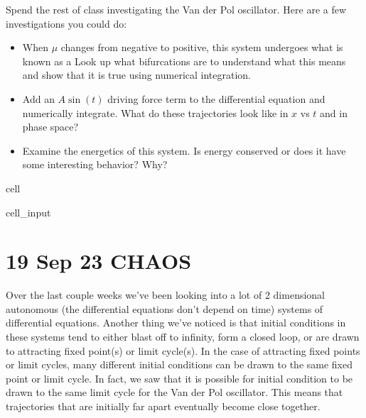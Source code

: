 \documentclass[letterpaper,10pt,english]{jupyterBook}
\begin{document}
\sphinxAtStartPar
Spend the rest of class investigating the Van der Pol oscillator. Here are a few investigations you could do:
\begin{itemize}
\item {} 
\sphinxAtStartPar
When \(\mu\) changes from negative to positive, this system undergoes what is known as a  Look up what bifurcations are to understand what this means and show that it is true using numerical integration.

\item {} 
\sphinxAtStartPar
Add an \(A\sin(t)\) driving force term to the differential equation and numerically integrate. What do these trajectories look like in \(x\) vs \(t\) and in phase space?

\item {} 
\sphinxAtStartPar
Examine the energetics of this system. Is energy conserved or does it have some interesting behavior? Why?

\end{itemize}

\begin{sphinxuseclass}{cell}\begin{sphinxVerbatimInput}

\begin{sphinxuseclass}{cell_input}
\begin{sphinxVerbatim}[commandchars=\\\{\}]
\end{sphinxVerbatim}

\end{sphinxuseclass}\end{sphinxVerbatimInput}

\end{sphinxuseclass}
\sphinxstepscope


\chapter{19 Sep 23 \sphinxhyphen{} CHAOS}
\label{\detokenize{content/1_mechanics/CHAOS:sep-23-chaos}}\label{\detokenize{content/1_mechanics/CHAOS::doc}}
\sphinxAtStartPar
Over the last couple weeks we’ve been looking into a lot of 2 dimensional autonomous (the differential equations don’t depend on time) systems of differential equations.
Another thing we’ve noticed is that initial conditions in these systems tend to either blast off to infinity, form a closed loop, or are drawn to attracting fixed point(s) or limit cycle(s). In the case of attracting fixed points or limit cycles, many different initial conditions can be drawn to the same fixed point or limit cycle. In fact, we saw that it is possible for  initial condition to be drawn to the same limit cycle for the Van der Pol oscillator. This means that trajectories that are initially far apart eventually become close together.
\end{document}

